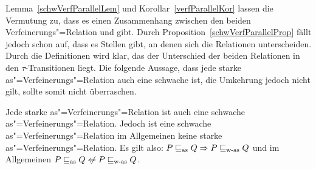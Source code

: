Lemma~\ref{schwVerfParallelLem} und Korollar~\ref{verfParallelKor} lassen die
Vermutung zu, dass es einen Zusammenhang zwischen den beiden
Verfeinerungs"=Relation \wasRel{} und \asRel{} gibt. Durch
Proposition~\ref{schwVerfParallelProp} fällt jedoch schon auf, dass es Stellen
gibt, an denen sich die Relationen unterscheiden. Durch die Definitionen wird
klar, das der Unterschied der beiden Relationen in den $\tau$-Transitionen
liegt. Die folgende Aussage, dass jede starke as"=Verfeinerungs"=Relation auch
eine schwache ist, die Umkehrung jedoch nicht gilt, sollte somit nicht
überraschen.

\begin{Lem}[Zusammenhang der Verfeinerungs"=Relationen]
  \label{ZusammenhWasAsLem}
  Jede starke as"=Verfeinerungs"=Relation ist auch eine schwache
  as"=Verfeinerungs"=Relation. Jedoch ist eine schwache
  as"=Verfeinerungs"=Relation im Allgemeinen keine starke
  as"=Verfeinerungs"=Relation. Es gilt also: $P \sqsubseteq _{\mathrm{as}} Q \Rightarrow P \sqsubseteq _{\mathrm{w}\text{-}\mathrm{as}}
  Q$ und im Allgemeinen $P \asRel Q \hspace{0.1cm}\not\hspace{-0.1cm}\Leftarrow
  P \wasRel Q$.
\end{Lem}

